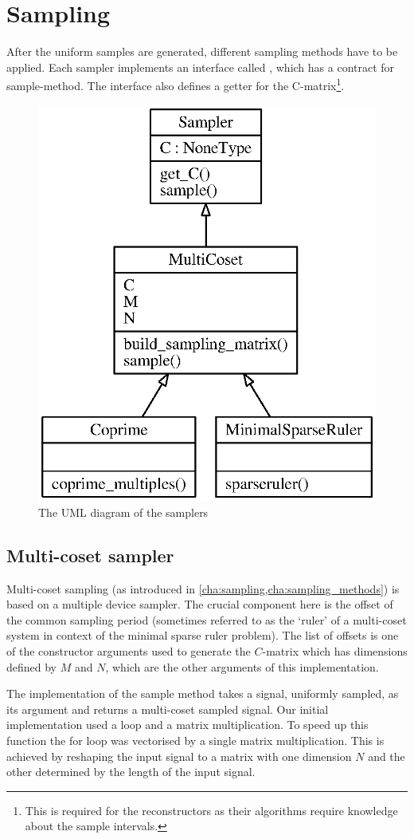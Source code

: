 \documentclass[a4paper, openany, oneside]{memoir}
\begin{document}
\section{Sampling}
\label{sec:sampling}
After the uniform samples are generated, different sampling methods have to be applied. Each sampler implements an interface called , which has a contract for sample-method. The interface also defines a getter for the C-matrix\footnote{This is required for the reconstructors as their algorithms require knowledge about the sample intervals.}.

\begin{figure}
    \centering
    \includegraphics[width=0.5\linewidth]{./figures/classes_sampling.eps}
    \caption{The UML diagram of the samplers}
    \label{fig:umlclasses}
\end{figure}

\subsection{Multi-coset sampler}
\label{sub:multi_coset_sampler}
Multi-coset sampling (as introduced in \cref{cha:sampling,cha:sampling_methods}) is based on a multiple device sampler. The crucial component here is the offset of the common sampling period (sometimes referred to as the `ruler' of a multi-coset system in context of the minimal sparse ruler problem). The list of offsets is one of the constructor arguments used to generate the $C$-matrix which has dimensions defined by $M$ and $N$, which are the other arguments of this implementation.

The implementation of the sample method takes a signal, uniformly sampled, as its argument and returns a multi-coset sampled signal. Our initial implementation used a loop and a matrix multiplication. To speed up this function the for loop was vectorised by a single matrix multiplication. This is achieved by reshaping the input signal to a matrix with one dimension $N$ and the other determined by the length of the input signal.
\end{document}
